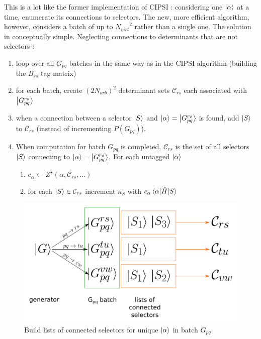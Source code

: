 \documentclass[./thesis.tex]{subfiles}
\begin{document}
This is a lot like the former implementation of CIPSI : considering one ${\ket{\alpha}}$ at a time, enumerate its connections to selectors. The new, more efficient algorithm, however, considers a batch of up to ${N_{virt}}^2$ rather than a single one. The solution in conceptually simple. Neglecting connections to determinants that are not selectors :
\begin{enumerate}
\item
loop over all $G_{pq}$ batches in the same way as in the CIPSI algorithm (building the $B_{rs}$ tag matrix)
\item
for each batch, create ${(2N_{orb})}^2$ determinant sets $\mathcal{C}_{rs}$ each associated with $\ket{G^{rs}_{pq}}$
\item
when a connection between a selector $\ket S$ and ${\ket{\alpha}} = \ket {G_{pq}^{rs}}$ is found, add $\ket S$ to $\mathcal{C}_{rs}$ (instead of incrementing $P(G_{pq})$).
\item
When computation for batch $G_{pq}$ is completed, $\mathcal{C}_{rs}$ is the set of all selectors $\ket S$ connecting to ${\ket{\alpha}} = \ket {G_{pq}^{rs}}$. For each untagged ${\ket{\alpha}}$
\begin{enumerate}
\item
$c_\alpha \gets Z^\star(\alpha, \mathcal{C}_{rs}, \ldots)$
\item
for each $\ket S \in \mathcal{C}_{rs}$ increment $\kappa_S$ with $c_\alpha \mel{\alpha}{\hat{H}}{S}$
\end{enumerate}


\end{enumerate}


\begin{figure}[h!]
	\begin{center}
		\includegraphics[width=0.7\columnwidth]{figures/matrix_dressing/buildlists}
		\caption{Build lists of connected selectors for unique ${\ket{\alpha}}$ in batch $G_{pq}$}
		\label{fig:buildlists}
	\end{center}
\end{figure}
\end{document}

